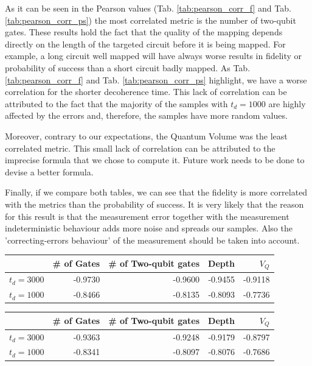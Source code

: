 As it can be seen in the Pearson values (Tab. \ref{tab:pearson_corr_f} and Tab. \ref{tab:pearson_corr_ps}) the most correlated metric is the number of two-qubit gates.
These results hold the fact that the quality of the mapping depends directly on the length of the targeted circuit before it is being mapped.
For example, a long circuit well mapped will have always worse results in fidelity or probability of success than a short circuit badly mapped.
As Tab. \ref{tab:pearson_corr_f} and Tab. \ref{tab:pearson_corr_ps} highlight, we have a worse correlation for the shorter decoherence time.
This lack of correlation can be attributed to the fact that the majority of the samples with \(t_d = 1000\) are highly affected by the errors and, therefore, the samples have more random values.

Moreover, contrary to our expectations, the Quantum Volume was the least correlated metric.
This small lack of correlation can be attributed to the imprecise formula that we chose to compute it.
Future work needs to be done to devise a better formula.

Finally, if we compare both tables, we can see that the fidelity is more correlated with the metrics than the probability of success.
It is very likely that the reason for this result is that the measurement error together with the measurement indeterministic behaviour  adds more noise and spreads our samples.
Also the 'correcting-errors behaviour' of the measurement should be taken into account.

\begin{center}
\begin{tabular}{lrrrr}
\hline
 & \# of Gates & \# of Two-qubit gates & Depth & \(V_Q\)\\
\hline
\(t_d = 3000\) & -0.9730 & -0.9600 & -0.9455 & -0.9118\\
\(t_d = 1000\) & -0.8466 & -0.8135 & -0.8093 & -0.7736\\
\hline
\end{tabular}
\end{center}

\begin{center}
\begin{tabular}{lrrrr}
\hline
 & \# of Gates & \# of Two-qubit gates & Depth & \(V_Q\)\\
\hline
\(t_d = 3000\) & -0.9363 & -0.9248 & -0.9179 & -0.8797\\
\(t_d = 1000\) & -0.8341 & -0.8097 & -0.8076 & -0.7686\\
\hline
\end{tabular}
\end{center}
